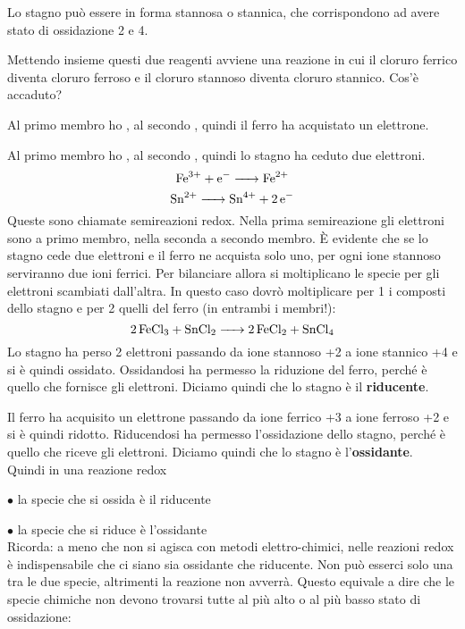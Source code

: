 Lo stagno può essere in forma stannosa o stannica, che corrispondono ad avere stato di ossidazione 2 e 4.

Mettendo insieme questi due reagenti avviene una reazione in cui il cloruro ferrico diventa cloruro ferroso e il cloruro stannoso diventa cloruro stannico. Cos'è accaduto?

Al primo membro ho , al secondo , quindi il ferro ha acquistato un elettrone.

Al primo membro ho , al secondo , quindi lo stagno ha ceduto due elettroni.
$$\ce{Fe^{3+} + e^- -> Fe^{2+}}$$
$$\ce{Sn^{2+} -> Sn^{4+} + 2 e^-}$$
Queste sono chiamate semireazioni redox.
Nella prima semireazione gli elettroni sono a primo membro, nella seconda a secondo membro.
È evidente che se lo stagno cede due elettroni e il ferro ne acquista solo uno, per ogni ione stannoso serviranno due ioni ferrici.
Per bilanciare allora si moltiplicano le specie per gli elettroni scambiati dall'altra.
In questo caso dovrò moltiplicare per 1 i composti dello stagno e per 2 quelli del ferro (in entrambi i membri!):
$$\ce{2 FeCl_3 + SnCl_2 -> 2 FeCl_2 + SnCl_4}$$
Lo stagno ha perso 2 elettroni passando da ione stannoso +2 a ione stannico +4 e si è quindi ossidato. Ossidandosi ha permesso la riduzione del ferro, perché è quello che fornisce gli elettroni. Diciamo quindi che lo stagno è il \textbf{riducente}.

Il ferro ha acquisito un elettrone passando da ione ferrico +3 a ione ferroso +2 e si è quindi ridotto. Riducendosi ha permesso l'ossidazione dello stagno, perché è quello che riceve gli elettroni. Diciamo quindi che lo stagno è l'\textbf{ossidante}.\\

Quindi in una reazione redox

$\bullet$ la specie che si ossida è il riducente

$\bullet$ la specie che si riduce è l'ossidante\\

Ricorda: a meno che non si agisca con metodi elettro-chimici, nelle reazioni redox è indispensabile che ci siano sia ossidante che riducente. Non può esserci solo una tra le due specie, altrimenti la reazione non avverrà. Questo equivale a dire che le specie chimiche non devono trovarsi tutte al più alto o al più basso stato di ossidazione:

